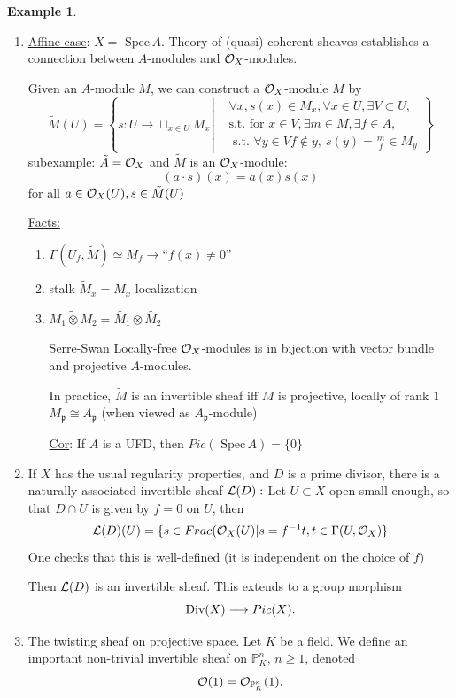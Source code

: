 \documentclass[11pt]{article}
\theoremstyle{definition}
\newtheorem{ex}[thm]{Example}
\newcommand{\spec}{\text{ Spec}\,}
\newcommand{\proj}{\mathbb P}
\newcommand{\scp}{{\mathfrak p}}
\newcommand{\call}{{\cal L}}
\newcommand{\calo}{{\cal O}}
\newcommand{\Div}{\textnormal{Div}}
\newcommand{\lrta}{\longrightarrow}
\begin{document}
\begin{ex}\ 
\begin{enumerate}[label=\boxed{\arabic*}]
\item \underline{Affine case}: $X=\spec A$. Theory of (quasi)-coherent sheaves establishes
 a connection between $A$-modules and $\calo_X$-modules.

Given an $A$-module $M$, we can construct a $\calo_X$-module  $\tilde{M}$ by 
$$
\tilde{M}(U)=\left\{s:U\lrta \sqcup_{x\in U}M_x\left|\begin{aligned}
&\forall x,s(x)\in M_x, \forall x\in U,\exists V\subset U
,\\
&\text{s.t. for } x\in V,\exists m\in M,\exists f\in A,\\ 
&\text{ s.t. } \forall y\in V f\notin y,\  s(y)=\frac{m}{f}\in M_y  
\end{aligned}
\right.\right\}
$$
subexample: $\tilde{A}=\calo_X$ and $\tilde{M}$ is an $\calo_X$-module:
$$
(a\cdot s)(x)=a(x)s(x)
$$
for all $a\in \calo_X(U), s\in \tilde{M}(U)$

\underline{Facts:}

\begin{enumerate}
\item $\Gamma(U_f,\tilde{M})\simeq M_f\lrta $``$f(x)\neq 0$''
\item stalk $\tilde{M}_x= M_x$ localization
\item $\widetilde{M_1\otimes M_2}=\tilde{M_1}\otimes\tilde{M_2}$
\item  [Serre-Swan] Locally-free $\calo_X$-modules is in bijection with vector bundle and  projective $A$-modules.

In practice, $\tilde{M}$ is an invertible sheaf iff $M$ is projective, locally of rank $1$ $M_\scp\cong A_\scp$ (when viewed as $A_\scp$-module)

\underline{Cor}: If $A$ is a UFD, then $Pic(\spec A)=\{0\}$
\end{enumerate}

\item If $X$ has the usual regularity properties, and $D$ is a prime divisor, there is a naturally associated invertible sheaf $\call(D):$ Let $U\subset X$ open small enough, so that $D\cap U$ is given by $f=0$ on $U$, then
$$
\call(D)(U)=\{s\in Frac(\calo_X(U)| s=f^{-1}t, t\in \Gamma(U, \calo_X)\}
$$
 One checks that this is well-defined (it is independent on the choice of $f$)

 Then $\call(D)$ is an invertible sheaf. This extends to a group morphism
 $$
  \Div(X)\lrta Pic(X).
 $$
 \item The twisting sheaf on projective space. Let $K$ be a field. We define an important non-trivial invertible sheaf on $\proj^n_K$, $n\geq 1$, denoted 
 $$
\calo(1)=\calo_{\proj^n_K}(1).
 $$


\end{enumerate}
\end{ex}
\end{document}
